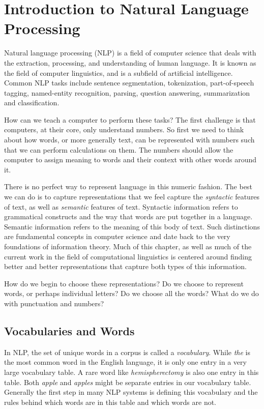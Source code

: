 \section{Introduction to Natural Language Processing}

Natural language processing (NLP) is a field of computer science that deals with the extraction, processing, and understanding of human language.
It is known as the field of computer linguistics, and is a subfield of artificial intelligence.
Common NLP tasks include sentence segmentation, tokenization, part-of-speech tagging, named-entity recognition, parsing, question answering, summarization and classification.

How can we teach a computer to perform these tasks?
The first challenge is that computers, at their core, only understand numbers.
So first we need to think about how words, or more generally text, can be represented with numbers such that we can perform calculations on them.
The numbers should allow the computer to assign meaning to words and their context with other words around it.

There is no perfect way to represent language in this numeric fashion. The best we can do is to capture representations that we feel capture the \textit{syntactic} features of text, as well as \textit{semantic} features of text.
Syntactic information refers to grammatical constructs and the way that words are put together in a language. Semantic information refers to the meaning of this body of text. Such distinctions are fundamental concepts in computer science
and date back to the very foundations of information theory. \cite{shannon48}
Much of this chapter, as well as much of the current work in the field of computational linguistics is centered around finding better and better representations that capture both types of this information.

How do we begin to choose these representations?
Do we choose to represent words, or perhaps individual letters?
Do we choose all the words?
What do we do with punctuation and numbers?

\subsection{Vocabularies and Words}
\label{vocabularies_and_words}
In NLP, the set of unique words in a corpus is called a \textit{vocabulary}. While \textit{the} is the most common word in the English language, it is only one entry in a very large vocabulary table. A rare word like \textit{hemispherectomy} is also one
entry in this table. Both \textit{apple} and \textit{apples} might be separate entries in our vocabulary table. Generally the first step in many NLP systems is defining this vocabulary and the rules behind which words are in this table and which words are not.

